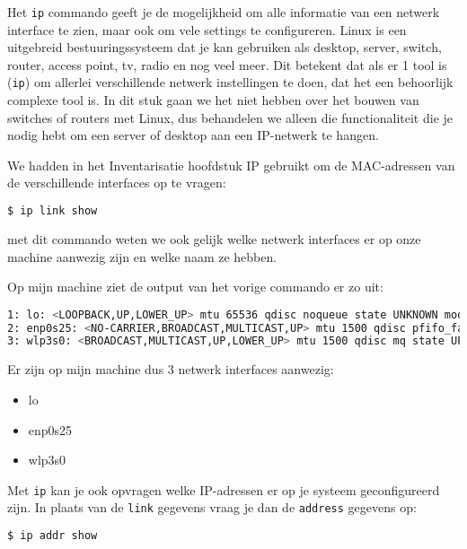 Het \texttt{ip} commando geeft je de mogelijkheid om alle informatie van een netwerk interface te zien, maar ook om vele settings te configureren. Linux is een uitgebreid bestuuringssysteem dat je kan gebruiken als desktop, server, switch, router, access point, tv, radio en nog veel meer. Dit betekent dat als er 1 tool is (\texttt{ip}) om allerlei verschillende netwerk instellingen te doen, dat het een behoorlijk complexe tool is. In dit stuk gaan we het niet hebben over het bouwen van switches of routers met Linux, dus behandelen we alleen die functionaliteit die je nodig hebt om een server of desktop aan een IP-netwerk te hangen.

We hadden in het Inventarisatie hoofdstuk IP gebruikt om de MAC-adressen van de verschillende interfaces op te vragen:
\begin{lstlisting}[language=bash]
$ ip link show
\end{lstlisting}
met dit commando weten we ook gelijk welke netwerk interfaces er op onze machine aanwezig zijn en welke naam ze hebben.

Op mijn machine ziet de output van het vorige commando er zo uit:
\begin{lstlisting}[language=bash]
1: lo: <LOOPBACK,UP,LOWER_UP> mtu 65536 qdisc noqueue state UNKNOWN mode DEFAULT group default qlen 1000 link/loopback 00:00:00:00:00:00 brd 00:00:00:00:00:00
2: enp0s25: <NO-CARRIER,BROADCAST,MULTICAST,UP> mtu 1500 qdisc pfifo_fast state DOWN mode DEFAULT group default qlen 1000 link/ether 54:ee:75:9c:ab:53 brd ff:ff:ff:ff:ff:ff
3: wlp3s0: <BROADCAST,MULTICAST,UP,LOWER_UP> mtu 1500 qdisc mq state UP mode DORMANT group default qlen 1000 link/ether a8:a7:95:91:2d:8b brd ff:ff:ff:ff:ff:ff
\end{lstlisting}
Er zijn op mijn machine dus 3 netwerk interfaces aanwezig:
\begin{itemize}
	\item lo
	\item enp0s25
	\item wlp3s0
\end{itemize}

Met \texttt{ip} kan je ook opvragen welke IP-adressen er op je systeem geconfigureerd zijn. In plaats van de \texttt{link} gegevens vraag je dan de \texttt{address} gegevens op:
\begin{lstlisting}[language=bash]
$ ip addr show
\end{lstlisting}

